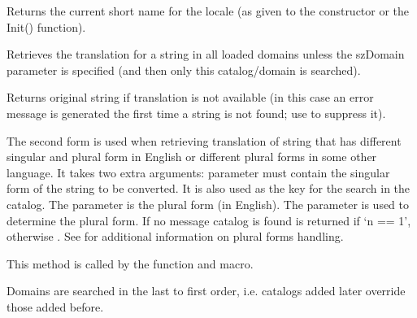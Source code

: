 \label{wxlocalegetname}


Returns the current short name for the locale (as given to the constructor or
the Init() function).


\label{wxlocalegetstring}



Retrieves the translation for a string in all loaded domains unless the szDomain
parameter is specified (and then only this catalog/domain is searched).

Returns original string if translation is not available
(in this case an error message is generated the first time
a string is not found; use  to suppress it).

The second form is used when retrieving translation of string that has
different singular and plural form in English or different plural forms in some
other language. It takes two extra arguments: 
parameter must contain the singular form of the string to be converted.
It is also used as the key for the search in the catalog.
The  parameter is the plural form (in English).
The parameter  is used to determine the plural form.  If no
message catalog is found  is returned if `n == 1',
otherwise .
See  for additional information on plural forms handling.

This method is called by the 
function and  macro.


Domains are searched in the last to first order, i.e. catalogs
added later override those added before.


\label{wxlocalegetheadervalue}


